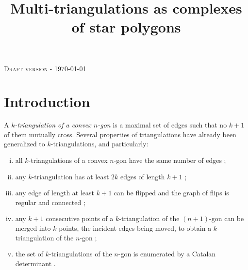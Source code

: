 \documentclass[12pt]{amsart}
\begin{document}
 

\newtheorem{theorem}{Theorem}
\newtheorem{proposition}{Proposition}
\newtheorem{lemma}{Lemma}
\newtheorem{corollary}{Corollary}
\newtheorem{definition}{Definition}
\newenvironment{remark}{\medskip\noindent{\textbf{Remark.}}}{\medskip}
\newenvironment{example}{\medskip\noindent{\textbf{Example.}}}{\medskip}

\newcommand{\cl}{\ensuremath{\prec}}
\newcommand{\cle}{\ensuremath{\preccurlyeq}}

\makeatletter
\newlength{\earraycolsep}
\setlength{\earraycolsep}{2pt}
\def\eqnarray{\stepcounter{equation}\let\@currentlabel%
\theequation
\global\@eqnswtrue\m@th
\global\@eqcnt\z@\tabskip\@centering\let\\\@eqncr
$$\halign to\displaywidth\bgroup\@eqnsel\hskip\@centering
$\displaystyle\tabskip\z@{##}$&\global\@eqcnt\@ne
\hskip 2\earraycolsep \hfil$\displaystyle{##}$\hfil
&\global\@eqcnt\tw@ \hskip 2\earraycolsep
$\displaystyle\tabskip\z@{##}$\hfil
\tabskip\@centering&\llap{##}\tabskip\z@\cr}
\makeatother

\title{Multi-triangulations as complexes of star polygons}
\maketitle

\begin{center}
\textsc{Draft version} - \today
\end{center}

\section{Introduction}\label{sectionintroduction}

A \emph{$k$-triangulation of a convex $n$-gon} is a maximal set of edges such that no $k+1$ of them mutually cross. Several properties of triangulations have already been generalized to $k$-triangulations, and particularly: 
\begin{enumerate}[(i)]
\item all $k$-triangulations of a convex $n$-gon have the same number of edges \cite{cp-tttccp-92,n-gdfcp-00,dkm-lahp-02};
\item any $k$-triangulation has at least $2k$ edges of length $k+1$ \cite{n-gdfcp-00};
\item any edge of length at least $k+1$ can be flipped and the graph of flips is regular and connected \cite{n-gdfcp-00,dkm-lahp-02};
\item any $k+1$ consecutive points of a $k$-triangulation of the $(n+1)$-gon can be merged into $k$ points, the incident edges being moved, to obtain a $k$-triangulation of the $n$-gon \cite{n-gdfcp-00,j-gt-03};
\item the set of $k$-triangulations of the $n$-gon is enumerated by a Catalan determinant \cite{j-gt-03,j-gtdfssp-05}.
\end{enumerate}
\end{document}
